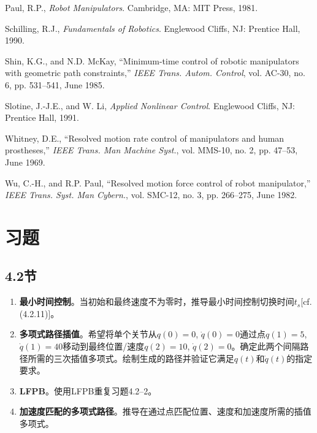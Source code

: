\documentclass[UTF8]{ctexart}
\theoremstyle{definition}
\begin{document}
\begin{enumerate}[label={[\arabic*]}, leftmargin=*]
\item Paul, R.P., \textit{Robot Manipulators}. Cambridge, MA: MIT Press, 1981.

\item Schilling, R.J., \textit{Fundamentals of Robotics}. Englewood Cliffs, NJ: Prentice Hall, 1990.

\item Shin, K.G., and N.D. McKay, ``Minimum-time control of robotic manipulators with geometric path constraints,'' \textit{IEEE Trans. Autom. Control}, vol. AC-30, no. 6, pp. 531--541, June 1985.

\item Slotine, J.-J.E., and W. Li, \textit{Applied Nonlinear Control}. Englewood Cliffs, NJ: Prentice Hall, 1991.

\item Whitney, D.E., ``Resolved motion rate control of manipulators and human prostheses,'' \textit{IEEE Trans. Man Machine Syst.}, vol. MMS-10, no. 2, pp. 47--53, June 1969.

\item Wu, C.-H., and R.P. Paul, ``Resolved motion force control of robot manipulator,'' \textit{IEEE Trans. Syst. Man Cybern.}, vol. SMC-12, no. 3, pp. 266--275, June 1982.
\end{enumerate}

\newpage
\section*{习题}

\subsection*{4.2节}
\begin{enumerate}[label=4.2--\arabic*]
\item \textbf{最小时间控制}。当初始和最终速度不为零时，推导最小时间控制切换时间$t_s$[cf. (4.2.11)]。

\item \textbf{多项式路径插值}。希望将单个关节从$q(0)=0$, $\dot{q}(0)=0$通过点$q(1)=5$, $\dot{q}(1)=40$移动到最终位置/速度$q(2)=10$, $\dot{q}(2)=0$。确定此两个间隔路径所需的三次插值多项式。绘制生成的路径并验证它满足$q(t)$和$\dot{q}(t)$的指定要求。

\item \textbf{LFPB}。使用LFPB重复习题4.2--2。

\item \textbf{加速度匹配的多项式路径}。推导在通过点匹配位置、速度和加速度所需的插值多项式。
\end{enumerate}
\end{document}
